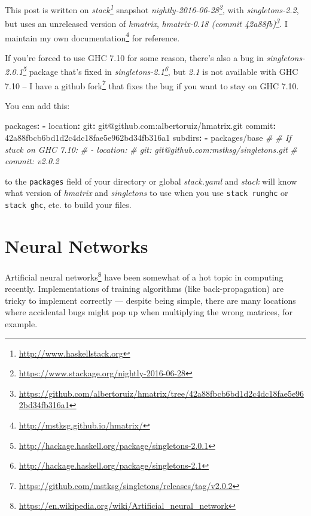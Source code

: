 \documentclass[]{article}
\newenvironment{Shaded}{}{}
\newcommand{\AttributeTok}[1]{\textcolor[rgb]{0.49,0.56,0.16}{#1}}
\newcommand{\CommentTok}[1]{\textcolor[rgb]{0.38,0.63,0.69}{\textit{#1}}}
\newcommand{\FunctionTok}[1]{\textcolor[rgb]{0.02,0.16,0.49}{#1}}
\newcommand{\KeywordTok}[1]{\textcolor[rgb]{0.00,0.44,0.13}{\textbf{#1}}}
\renewcommand{\href}[2]{#2\footnote{\url{#1}}}
\begin{document}
This post is written on \emph{\href{http://www.haskellstack.org}{stack}}
snapshot
\emph{\href{https://www.stackage.org/nightly-2016-06-28}{nightly-2016-06-28}},
with \emph{singletons-2.2}, but uses an unreleased version of \emph{hmatrix},
\emph{\href{https://github.com/albertoruiz/hmatrix/tree/42a88fbcb6bd1d2c4dc18fae5e962bd34fb316a1}{hmatrix-0.18
(commit 42a88fb)}}. I \href{http://mstksg.github.io/hmatrix/}{maintain my own
documentation} for reference.

If you're forced to use GHC 7.10 for some reason, there's also a bug in
\emph{\href{http://hackage.haskell.org/package/singletons-2.0.1}{singletons-2.0.1}}
package that's fixed in
\emph{\href{http://hackage.haskell.org/package/singletons-2.1}{singletons-2.1}},
but \emph{2.1} is not available with GHC 7.10 -- I have a
\href{https://github.com/mstksg/singletons/releases/tag/v2.0.2}{github fork}
that fixes the bug if you want to stay on GHC 7.10.

You can add this:

\begin{Shaded}
\begin{Highlighting}[]
\FunctionTok{packages}\KeywordTok{:}
\KeywordTok{{-}}\AttributeTok{ }\FunctionTok{location}\KeywordTok{:}
\AttributeTok{    }\FunctionTok{git}\KeywordTok{:}\AttributeTok{ git@github.com:albertoruiz/hmatrix.git}
\AttributeTok{    }\FunctionTok{commit}\KeywordTok{:}\AttributeTok{ 42a88fbcb6bd1d2c4dc18fae5e962bd34fb316a1}
\AttributeTok{  }\FunctionTok{subdirs}\KeywordTok{:}
\AttributeTok{    }\KeywordTok{{-}}\AttributeTok{ packages/base}
\CommentTok{\# \# If stuck on GHC 7.10:}
\CommentTok{\# {-} location:}
\CommentTok{\#     git: git@github.com:mstksg/singletons.git}
\CommentTok{\#     commit: v2.0.2}
\end{Highlighting}
\end{Shaded}

to the \texttt{packages} field of your directory or global \emph{stack.yaml} and
\emph{stack} will know what version of \emph{hmatrix} and \emph{singletons} to
use when you use \texttt{stack\ runghc} or \texttt{stack\ ghc}, etc. to build
your files.

\section{Neural Networks}\label{neural-networks}

\href{https://en.wikipedia.org/wiki/Artificial_neural_network}{Artificial neural
networks} have been somewhat of a hot topic in computing recently.
Implementations of training algorithms (like back-propagation) are tricky to
implement correctly --- despite being simple, there are many locations where
accidental bugs might pop up when multiplying the wrong matrices, for example.
\end{document}
